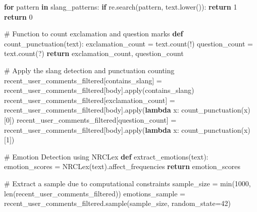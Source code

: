 \documentclass[
  12pt,
  letterpaper,
  DIV=11,
  numbers=noendperiod]{scrartcl}
\newenvironment{Shaded}{\begin{snugshade}}{\end{snugshade}}
\newcommand{\BuiltInTok}[1]{\textcolor[rgb]{0.00,0.23,0.31}{#1}}
\newcommand{\CommentTok}[1]{\textcolor[rgb]{0.37,0.37,0.37}{#1}}
\newcommand{\ControlFlowTok}[1]{\textcolor[rgb]{0.00,0.23,0.31}{\textbf{#1}}}
\newcommand{\DecValTok}[1]{\textcolor[rgb]{0.68,0.00,0.00}{#1}}
\newcommand{\KeywordTok}[1]{\textcolor[rgb]{0.00,0.23,0.31}{\textbf{#1}}}
\newcommand{\NormalTok}[1]{\textcolor[rgb]{0.00,0.23,0.31}{#1}}
\newcommand{\OperatorTok}[1]{\textcolor[rgb]{0.37,0.37,0.37}{#1}}
\newcommand{\StringTok}[1]{\textcolor[rgb]{0.13,0.47,0.30}{#1}}
\begin{document}
\begin{Shaded}
\begin{Highlighting}[]
    \ControlFlowTok{for}\NormalTok{ pattern }\KeywordTok{in}\NormalTok{ slang\_patterns:}
        \ControlFlowTok{if}\NormalTok{ re.search(pattern, text.lower()):}
            \ControlFlowTok{return} \DecValTok{1}
    \ControlFlowTok{return} \DecValTok{0}

\CommentTok{\# Function to count exclamation and question marks}
\KeywordTok{def}\NormalTok{ count\_punctuation(text):}
\NormalTok{    exclamation\_count }\OperatorTok{=}\NormalTok{ text.count(}\StringTok{\textquotesingle{}!\textquotesingle{}}\NormalTok{)}
\NormalTok{    question\_count }\OperatorTok{=}\NormalTok{ text.count(}\StringTok{\textquotesingle{}?\textquotesingle{}}\NormalTok{)}
    \ControlFlowTok{return}\NormalTok{ exclamation\_count, question\_count}

\CommentTok{\# Apply the slang detection and punctuation counting}
\NormalTok{recent\_user\_comments\_filtered[}\StringTok{\textquotesingle{}contains\_slang\textquotesingle{}}\NormalTok{] }\OperatorTok{=}\NormalTok{ recent\_user\_comments\_filtered[}\StringTok{\textquotesingle{}body\textquotesingle{}}\NormalTok{].}\BuiltInTok{apply}\NormalTok{(contains\_slang)}
\NormalTok{recent\_user\_comments\_filtered[}\StringTok{\textquotesingle{}exclamation\_count\textquotesingle{}}\NormalTok{] }\OperatorTok{=}\NormalTok{ recent\_user\_comments\_filtered[}\StringTok{\textquotesingle{}body\textquotesingle{}}\NormalTok{].}\BuiltInTok{apply}\NormalTok{(}\KeywordTok{lambda}\NormalTok{ x: count\_punctuation(x)[}\DecValTok{0}\NormalTok{])}
\NormalTok{recent\_user\_comments\_filtered[}\StringTok{\textquotesingle{}question\_count\textquotesingle{}}\NormalTok{] }\OperatorTok{=}\NormalTok{ recent\_user\_comments\_filtered[}\StringTok{\textquotesingle{}body\textquotesingle{}}\NormalTok{].}\BuiltInTok{apply}\NormalTok{(}\KeywordTok{lambda}\NormalTok{ x: count\_punctuation(x)[}\DecValTok{1}\NormalTok{])}

\CommentTok{\# Emotion Detection using NRCLex}
\KeywordTok{def}\NormalTok{ extract\_emotions(text):}
\NormalTok{    emotion\_scores }\OperatorTok{=}\NormalTok{ NRCLex(text).affect\_frequencies}
    \ControlFlowTok{return}\NormalTok{ emotion\_scores}

\CommentTok{\# Extract a sample due to computational constraints}
\NormalTok{sample\_size }\OperatorTok{=} \BuiltInTok{min}\NormalTok{(}\DecValTok{1000}\NormalTok{, }\BuiltInTok{len}\NormalTok{(recent\_user\_comments\_filtered))}
\NormalTok{emotions\_sample }\OperatorTok{=}\NormalTok{ recent\_user\_comments\_filtered.sample(sample\_size, random\_state}\OperatorTok{=}\DecValTok{42}\NormalTok{)}


\end{Highlighting}
\end{Shaded}
\end{document}

